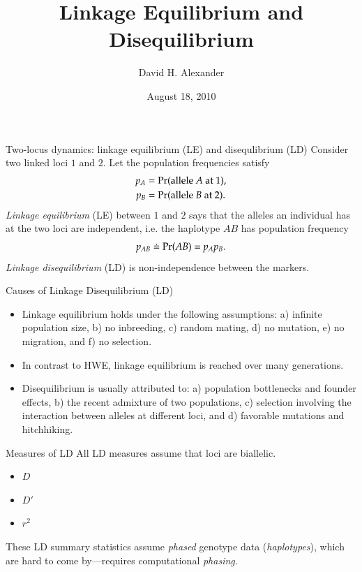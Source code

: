 \documentclass[serif,mathserif,professionalfonts,svgnames]{beamer}
\title{Linkage Equilibrium and Disequilibrium}
\author{David H. Alexander}
\date{August 18, 2010}
\def\Pr{\mathop{\rm Pr\,\!}\nolimits}
\begin{document}
\setlength{\parskip}{10pt plus 1pt minus 1pt}

\maketitle


\begin{frame}{Two-locus dynamics: linkage equilibrium (LE) and disequlibrium (LD)}
  Consider two linked  loci $1$ and $2$.  Let the population frequencies satisfy
  \begin{align*}
    p_A  & =  \Pr(\text{allele } A \text{ at } 1),  \\
    p_B  & =  \Pr(\text{allele } B \text{ at } 2).
  \end{align*}
  \emph{Linkage equilibrium} (LE) between $1$ and $2$ says that the
  alleles an individual has at the two loci are independent, i.e. the
  haplotype $AB$ has population frequency
  \begin{equation*}
    p_{AB} \doteq \Pr(AB) = p_A p_B. 
  \end{equation*}
  \emph{Linkage disequilibrium} (LD) is non-independence between the markers.
\end{frame}


\begin{frame}{Causes of Linkage Disequilibrium (LD)}
\begin{itemize}
\item Linkage equilibrium holds under the following assumptions: a) infinite 
population size, b) no inbreeding, c) random mating, d) no mutation, e) no migration,
and f) no selection.
\item In contrast to HWE, linkage equilibrium is reached over many generations.
\item Disequilibrium is usually attributed to: a) population bottlenecks and founder
effects, b) the recent admixture of two populations, c) selection involving the interaction 
between alleles at different loci, and d) favorable mutations and hitchhiking. 
\end{itemize}
\end{frame}

\begin{frame}{Measures of LD}
  All LD measures assume that loci are biallelic.

  \begin{itemize}
  \item $D$
  \item $D'$
  \item $r^2$
  \end{itemize}

  These LD summary statistics assume \emph{phased} genotype data
  (\emph{haplotypes}), which are hard to come by---requires
  computational \emph{phasing}.
\end{frame}
\end{document}
